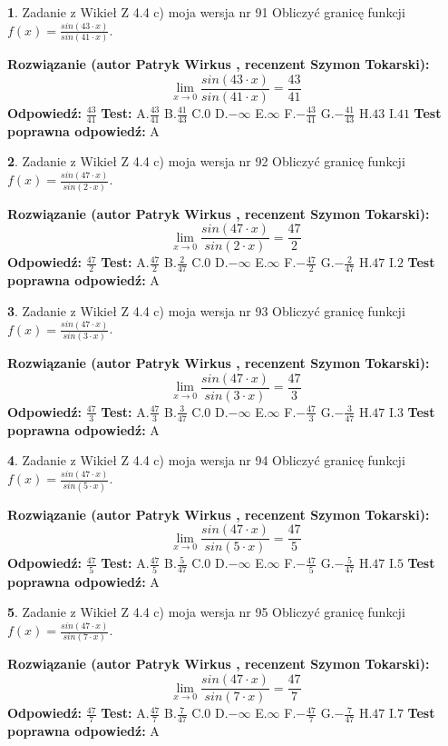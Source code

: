\documentclass[12pt, a4paper]{article}
\theoremstyle{definition} %
\newtheorem{zad}{}
\newcommand{\zadStart}[1]{\begin{zad}#1\newline}
\newcommand{\zadStop}{\end{zad}}
\newcommand{\rozwStart}[2]{\noindent \textbf{Rozwiązanie (autor #1 , recenzent #2): }\newline}
\newcommand{\rozwStop}{\newline}
\newcommand{\odpStart}{\noindent \textbf{Odpowiedź:}\newline}
\newcommand{\odpStop}{\newline}
\newcommand{\testStart}{\noindent \textbf{Test:}\newline}
\newcommand{\testStop}{\newline}
\newcommand{\kluczStart}{\noindent \textbf{Test poprawna odpowiedź:}\newline}
\newcommand{\kluczStop}{\newline}
\begin{document}
\zadStart{Zadanie z Wikieł Z 4.4 c) moja wersja nr 91}
Obliczyć granicę funkcji $f(x)=\frac{sin(43\cdot x)}{sin(41\cdot x)}$.
\zadStop
\rozwStart{Patryk Wirkus}{Szymon Tokarski}
$$\lim\limits_{x\to 0}\frac{sin(43\cdot x)}{sin(41\cdot x)}=
\frac{43}{41}$$
\rozwStop
\odpStart
$\frac{43}{41}$
\odpStop
\testStart
A.$\frac{43}{41}$
B.$\frac{41}{43}$
C.$0$
D.$-\infty$
E.$\infty$
F.$-\frac{43}{41}$
G.$-\frac{41}{43}$
H.$43$
I.$41$
\testStop
\kluczStart
A
\kluczStop



\zadStart{Zadanie z Wikieł Z 4.4 c) moja wersja nr 92}
Obliczyć granicę funkcji $f(x)=\frac{sin(47\cdot x)}{sin(2\cdot x)}$.
\zadStop
\rozwStart{Patryk Wirkus}{Szymon Tokarski}
$$\lim\limits_{x\to 0}\frac{sin(47\cdot x)}{sin(2\cdot x)}=
\frac{47}{2}$$
\rozwStop
\odpStart
$\frac{47}{2}$
\odpStop
\testStart
A.$\frac{47}{2}$
B.$\frac{2}{47}$
C.$0$
D.$-\infty$
E.$\infty$
F.$-\frac{47}{2}$
G.$-\frac{2}{47}$
H.$47$
I.$2$
\testStop
\kluczStart
A
\kluczStop



\zadStart{Zadanie z Wikieł Z 4.4 c) moja wersja nr 93}
Obliczyć granicę funkcji $f(x)=\frac{sin(47\cdot x)}{sin(3\cdot x)}$.
\zadStop
\rozwStart{Patryk Wirkus}{Szymon Tokarski}
$$\lim\limits_{x\to 0}\frac{sin(47\cdot x)}{sin(3\cdot x)}=
\frac{47}{3}$$
\rozwStop
\odpStart
$\frac{47}{3}$
\odpStop
\testStart
A.$\frac{47}{3}$
B.$\frac{3}{47}$
C.$0$
D.$-\infty$
E.$\infty$
F.$-\frac{47}{3}$
G.$-\frac{3}{47}$
H.$47$
I.$3$
\testStop
\kluczStart
A
\kluczStop



\zadStart{Zadanie z Wikieł Z 4.4 c) moja wersja nr 94}
Obliczyć granicę funkcji $f(x)=\frac{sin(47\cdot x)}{sin(5\cdot x)}$.
\zadStop
\rozwStart{Patryk Wirkus}{Szymon Tokarski}
$$\lim\limits_{x\to 0}\frac{sin(47\cdot x)}{sin(5\cdot x)}=
\frac{47}{5}$$
\rozwStop
\odpStart
$\frac{47}{5}$
\odpStop
\testStart
A.$\frac{47}{5}$
B.$\frac{5}{47}$
C.$0$
D.$-\infty$
E.$\infty$
F.$-\frac{47}{5}$
G.$-\frac{5}{47}$
H.$47$
I.$5$
\testStop
\kluczStart
A
\kluczStop



\zadStart{Zadanie z Wikieł Z 4.4 c) moja wersja nr 95}
Obliczyć granicę funkcji $f(x)=\frac{sin(47\cdot x)}{sin(7\cdot x)}$.
\zadStop
\rozwStart{Patryk Wirkus}{Szymon Tokarski}
$$\lim\limits_{x\to 0}\frac{sin(47\cdot x)}{sin(7\cdot x)}=
\frac{47}{7}$$
\rozwStop
\odpStart
$\frac{47}{7}$
\odpStop
\testStart
A.$\frac{47}{7}$
B.$\frac{7}{47}$
C.$0$
D.$-\infty$
E.$\infty$
F.$-\frac{47}{7}$
G.$-\frac{7}{47}$
H.$47$
I.$7$
\testStop
\kluczStart
A
\kluczStop
\end{document}
